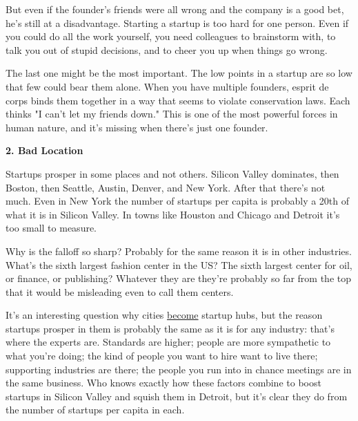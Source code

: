 But
                    even if the founder's friends were all wrong and the company
                    is a good bet, he's still at a disadvantage. Starting a
                    startup is too hard for one person. Even if you could do all
                    the work yourself, you need colleagues to brainstorm with,
                    to talk you out of stupid decisions, and to cheer you up
                    when things go wrong.

The last one might be the
                    most important. The low points in a startup are so low that
                    few could bear them alone. When you have multiple founders,
                    esprit de corps binds them together in a way that seems to
                    violate conservation laws. Each thinks "I can't let my
                    friends down." This is one of the most powerful forces in
                    human nature, and it's missing when there's just one
                    founder.

\textbf{2. Bad Location}

Startups prosper in some places and not others.
                    Silicon Valley dominates, then Boston, then Seattle, Austin,
                    Denver, and New York. After that there's not much. Even in
                    New York the number of startups per capita is probably a
                    20th of what it is in Silicon Valley. In towns like Houston
                    and Chicago and Detroit it's too small to measure.

Why
                    is the falloff so sharp? Probably for the same reason it is
                    in other industries. What's the sixth largest fashion center
                    in the US? The sixth largest center for oil, or finance, or
                    publishing? Whatever they are they're probably so far from
                    the top that it would be misleading even to call them
                    centers.

It's an interesting question why cities
                    \href{http://www.paulgraham.com/siliconvalley.html}{become} startup hubs, but
                    the reason startups prosper in them is probably the same as
                    it is for any industry: that's where the experts are.
                    Standards are higher; people are more sympathetic to what
                    you're doing; the kind of people you want to hire want to
                    live there; supporting industries are there; the people you
                    run into in chance meetings are in the same business. Who
                    knows exactly how these factors combine to boost startups in
                    Silicon Valley and squish them in Detroit, but it's clear
                    they do from the number of startups per capita in each.

